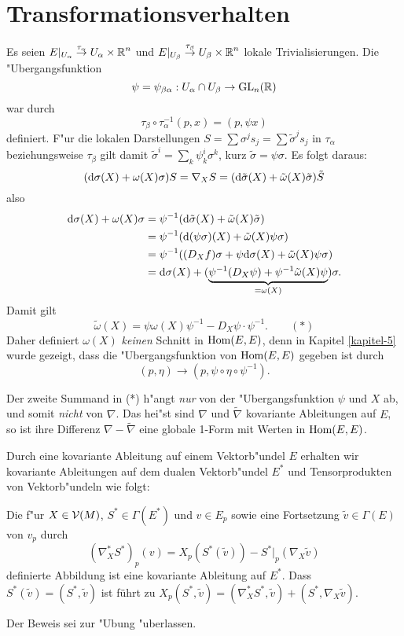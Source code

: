 \section{Transformationsverhalten}

Es seien $E|_{U_\alpha} \overset{\tau_\alpha}{\to} U_\alpha \times \operatorname{\mathbb{R}}^n$ und $E|_{U_\beta} \overset{\tau_\beta}{\to} U_{\beta} \times \operatorname{\mathbb{R}}^n$ lokale Trivialisierungen. Die "Ubergangsfunktion
	\[ \psi = \psi_{\beta\alpha}: U_\alpha \cap U_\beta \to \operatorname{GL}_n(\operatorname{\mathbb{R}}) \]
war durch
	\[ \tau_\beta \circ \tau_\alpha^{-1} (p,x) = (p, \psi x) \]
definiert. F"ur die lokalen Darstellungen $S = \sum \sigma^j s_j = \sum \tilde\sigma^j s_j$ in $\tau_\alpha$ beziehungsweise $\tau_\beta$ gilt damit $\tilde\sigma^{i} = \sum_k \psi_k^{i} \sigma^k$, kurz $\tilde\sigma = \psi \sigma$. Es folgt daraus:
	\[ (\mathrm{d} \sigma(X) + \omega(X) \sigma) S = \nabla_X S = (\mathrm{d} \tilde\sigma(X) + \tilde\omega(X)\tilde\sigma) \tilde S \]
also
\begin{align*}
	\mathrm{d} \sigma(X) + \omega(X) \sigma &= \psi^{-1}(\mathrm{d} \tilde\sigma(X) + \tilde\omega(X) \tilde\sigma)\\
	&= \psi^{-1} (\mathrm{d}(\psi\sigma)(X) + \tilde\omega(X) \psi \sigma)\\
	&= \psi^{-1} ((D_X f) \sigma + \psi \mathrm{d} \sigma(X) + \tilde\omega(X) \psi \sigma)\\
	&= \mathrm{d} \sigma(X) + (\underbrace{\psi^{-1}(D_X \psi) + \psi^{-1} \tilde\omega(X) \psi}_{=\omega(X)}) \sigma.
\end{align*}
Damit gilt
	\[ \tilde\omega(X) = \psi \omega(X) \psi^{-1} - D_X \psi \cdot \psi^{-1}. \qquad (*) \]
Daher definiert $\omega(X)$ \emph{keinen} Schnitt in $\operatorname{Hom}(E, E)$, denn in Kapitel \ref{kapitel-5} wurde gezeigt, dass die "Ubergangsfunktion von $\operatorname{Hom}(E, E)$ gegeben ist durch
	\[ (p, \eta) \to (p, \psi \circ \eta \circ \psi^{-1}). \]

\begin{bem}
Der zweite Summand in (*) h"angt \emph{nur} von der "Ubergangsfunktion $\psi$ und $X$ ab, und somit \emph{nicht} von $\nabla$. Das hei"st sind $\nabla$ und $\tilde\nabla$ kovariante Ableitungen auf $E$, so ist ihre Differenz $\nabla - \tilde\nabla$ eine globale 1-Form mit Werten in $\operatorname{Hom}(E,E)$.
\end{bem}

Durch eine kovariante Ableitung auf einem Vektorb"undel $E$ erhalten wir kovariante Ableitungen auf dem dualen Vektorb"undel $E^*$ und Tensorprodukten von Vektorb"undeln wie folgt:

\begin{Prop}
Die f"ur $X \in \operatorname{\mathcal{V}}(M)$, $S^* \in \Gamma(E^*)$ und $v \in E_p$ sowie eine Fortsetzung $\tilde v \in \Gamma(E)$ von $v_p$ durch
	\[ (\nabla_X^* S^*)_p(v) = X_p(S^*(\tilde v)) - S^*|_p (\nabla_X \tilde v) \]
definierte Abbildung ist eine kovariante Ableitung auf $E^*$. Dass $S^*(\tilde v) = (S^*, \tilde v)$ ist führt zu $X_p(S^*, \tilde v) = (\nabla_X^* S^*, \tilde v) + (S^*, \nabla_X \tilde v)$.
\end{Prop}
Der Beweis sei zur "Ubung "uberlassen.


